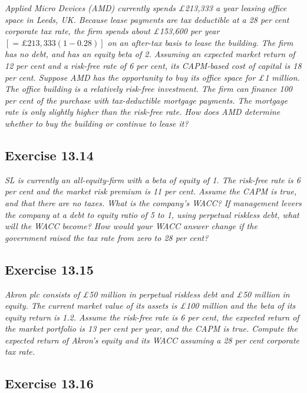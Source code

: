 \documentclass[]{book}
\theoremstyle{definition}
\theoremstyle{definition}
\theoremstyle{remark}
\begin{document}
\emph{Applied Micro Devices (AMD) currently spends £213,333 a year
leasing office space in Leeds, UK. Because lease payments are tax
deductible at a 28 per cent corporate tax rate, the firm spends about
£153,600 per year \(\left[= £213,333\left(1-0.28\right)\right]\) on an
after-tax basis to lease the building. The firm has no debt, and has an
equity beta of 2. Assuming an expected market return of 12 per cent and
a risk-free rate of 6 per cent, its CAPM-based cost of capital is 18 per
cent. Suppose AMD has the opportunity to buy its office space for £1
million. The office building is a relatively risk-free investment. The
firm can finance 100 per cent of the purchase with tax-deductible
mortgage payments. The mortgage rate is only slightly higher than the
risk-free rate. How does AMD determine whether to buy the building or
continue to lease it?} \citep[p.460]{book}

\subsection{Exercise 13.14}\label{exercise-13.14}

\emph{SL is currently an all-equity-firm with a beta of equity of 1. The
risk-free rate is 6 per cent and the market risk premium is 11 per cent.
Assume the CAPM is true, and that there are no taxes. What is the
company's WACC? If management levers the company at a debt to equity
ratio of 5 to 1, using perpetual riskless debt, what will the WACC
become? How would your WACC answer change if the government raised the
tax rate from zero to 28 per cent?} \citep[p.460]{book}

\subsection{Exercise 13.15}\label{exercise-13.15}

\emph{Akron plc consists of £50 million in perpetual riskless debt and
£50 million in equity. The current market value of its assets is £100
million and the beta of its equity return is 1.2. Assume the risk-free
rate is 6 per cent, the expected return of the market portfolio is 13
per cent per year, and the CAPM is true. Compute the expected return of
Akron's equity and its WACC assuming a 28 per cent corporate tax rate.}
\citep[p.460]{book}

\subsection{Exercise 13.16}\label{exercise-13.16}
\end{document}
